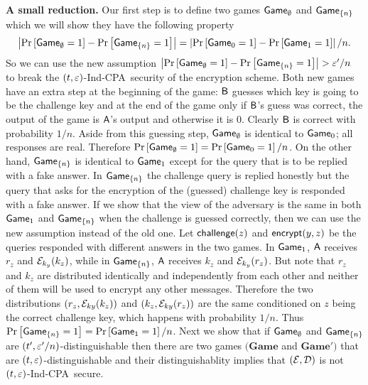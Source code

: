 \documentclass{article}
\newcommand{\tcpa}{$(t,\eps)$-Ind-CPA}
\def\B{{\sf B}}
\def\A{{\sf A}}
\def\E{{\cal E}}
\def\D{{\cal D}}
\newcommand{\encrypt}{{\sf encrypt}}
\newcommand{\game}{{\sf Game}}
\newcommand{\dgame}{{\mathbf{Game}}}
\def\challenge{{\sf challenge}}
\begin{document}
\noindent \textbf{A small reduction.} Our first step is to define two games $\game_{\emptyset}$ and $\game_{\{n\}}$ which we will show they have the following property 
\[\abs{\prob{\game_{\emptyset}=1}-\prob{\game_{\{n\}}=1}}=\abs{\prob{\game_0=1}-\prob{\game_1=1}}/n. \]
\noindent So we can use the new assumption $\abs{\prob{\game_{\emptyset}=1}-\prob{\game_{\{n\}}=1}} > \eps'/n$ to break the \tcpa~security of the encryption scheme. Both new games have an extra step at the beginning of the game: $\B$ guesses which key is going to be the challenge key and at the end of the game only if $\B$'s guess was correct, the output of the game is $\A$'s output and otherwise it is 0. Clearly $\B$ is correct with probability $1/n$. Aside from this guessing step, $\game_{\emptyset}$ is identical to $\game_0$; all responses are real. Therefore $\prob{\game_{\emptyset}=1}= \prob{\game_0=1}/n$. On the other hand, $\game_{\{n\}}$ is identical to $\game_1$ except for the query that is to be replied with a fake answer. In $\game_{\{n\}}$ the challenge query is replied honestly but the query that asks for the encryption of the (guessed) challenge key is responded with a fake answer. If we show that the view of the adversary is the same in both $\game_1$ and $\game_{\{n\}}$ when the challenge is guessed correctly, then we can use the new assumption instead of the old one. Let $\challenge(z)$ and $\encrypt(y,z)$ be the queries responded with different answers in the two games.  In $\game_{1}$, $\A$ receives $r_z$ and $\E_{k_{y}}(k_z)$, while in $\game_{\cub{n}}$, $\A$ receives $k_z$ and $\E_{k_y}(r_z)$. But note that $r_z$ and $k_z$ are distributed identically and independently from each other and neither of them will be used to encrypt any other messages. Therefore the two distributions $(r_z,\E_{k{y}}(k_z))$ and $(k_z,\E_{k{y}}(r_z))$ are the same conditioned on $z$ being the correct challenge key, which happens with probability $1/n$. Thus $\prob{\game_{\{n\}}=1}= \prob{\game_1=1}/n$. Next we show that if $\game_{\emptyset}$ and $\game_{\cub{n}}$ are $(t',\varepsilon'/n)$-distinguishable then there are two games $(\dgame$ and $\dgame')$ that are $(t,\varepsilon)$-distinguishable and their distinguishablity implies that $(\E,\D)$ is not \tcpa~secure.\\ 
\end{document}
